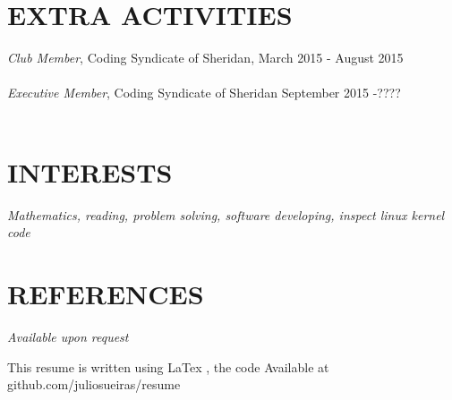 \documentclass[margin, 10pt]{res} %
\begin{document}
\begin{resume}
\section{EXTRA ACTIVITIES}

{\it Club Member}, Coding Syndicate of Sheridan, March 2015 - August 2015  \\
\\
{\it Executive Member}, Coding Syndicate of Sheridan September 2015 -???? \\
\\

\section{INTERESTS}
{\it Mathematics, reading, problem solving, software developing, inspect linux kernel code}

\section{REFERENCES}
{\it Available upon request}



\textmd{This resume is written using LaTex , the code Available at github.com/juliosueiras/resume}
\end{resume}
\end{document}
